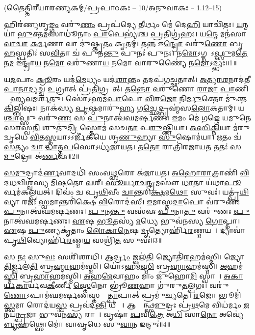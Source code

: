 
\vspace{-1ex}
\centerline{\normalsize (𑌤𑍈𑌤𑍍𑌤𑌿𑌰𑍀𑌯𑌾𑌰𑌣𑍍𑌯𑌕𑌮𑍍/𑌪𑍍𑌰𑌪𑌾𑌠𑌕𑌃 – 10/𑌅𑌨𑍁𑌵𑌾𑌕𑌃 – 1.12–15)}

𑌹𑌿𑌰॑𑌣𑍍𑌯𑌶𑍃\ul{𑌙𑍍𑌗𑌂} 𑌵𑌰𑍁॑\ul{𑌣𑌂} 𑌪𑍍𑌰𑌪॑𑌦𑍍𑌯𑍇 \ul{𑌤𑍀}𑌰𑍍𑌥𑌂 𑌮𑍇॑ 𑌦𑍇\ul{𑌹𑌿} 𑌯𑌾𑌚𑌿॑𑌤𑌃। \ul{𑌯}𑌨𑍍𑌮𑌯𑌾॑ \ul{𑌭𑍁}𑌕𑍍𑌤\ul{𑌮}𑌸𑌾𑌧𑍂॑𑌨𑌾𑌂 \ul{𑌪𑌾}𑌪𑍇𑌭𑍍𑌯॑𑌶𑍍𑌚 \ul{𑌪𑍍𑌰}𑌤𑌿𑌗𑍍𑌰॑𑌹𑌃। 𑌯\ul{𑌨𑍍𑌮𑍇} 𑌮𑌨॑𑌸𑌾 \ul{𑌵𑌾}\ul{𑌚𑌾} \ul{𑌕}\ul{𑌰𑍍𑌮}𑌣𑌾 𑌵𑌾 𑌦𑍁॑𑌷𑍍𑌕𑍃\ul{𑌤𑌂} 𑌕𑍃𑌤𑌮𑍍। 𑌤\ul{𑌨𑍍𑌨} 𑌇\ul{𑌨𑍍𑌦𑍍𑌰𑍋} 𑌵𑌰𑍁॑\ul{𑌣𑍋} 𑌬𑍃\ul{𑌹}𑌸𑍍𑌪𑌤𑌿𑌃॑ 𑌸\ul{𑌵𑌿}𑌤𑌾 𑌚॑ 𑌪𑍁𑌨\ul{𑌨𑍍𑌤𑍁} 𑌪𑍁𑌨𑌃॑ 𑌪𑍁𑌨𑌃। 𑌨\ul{𑌮𑍋}𑌽𑌗𑍍𑌨𑌯𑍇᳚𑌽\ul{𑌫𑍍𑌸𑍁}𑌮\ul{𑌤𑍇} 𑌨\ul{𑌮} 𑌇𑌨𑍍𑌦𑍍𑌰𑌾॑\ul{𑌯} 𑌨\ul{𑌮𑍋} 𑌵𑌰𑍁॑𑌣𑌾\ul{𑌯} 𑌨𑌮𑍋 𑌵𑌾𑌰𑍁𑌣𑍍𑌯𑍈॑ 𑌨\ul{𑌮𑍋}𑌽𑌦𑍍𑌭𑍍𑌯𑌃॥1॥

 𑌯\ul{𑌦}𑌪𑌾𑌂 \ul{𑌕𑍍𑌰𑍂}𑌰𑌂 𑌯𑌦॑\ul{𑌮𑍇}𑌧𑍍𑌯𑌂 𑌯𑌦॑\ul{𑌶𑌾}𑌨𑍍𑌤𑌂 𑌤𑌦𑌪॑𑌗𑌚𑍍𑌛𑌤𑌾𑌤𑍍। \ul{𑌅}\ul{𑌤𑍍𑌯𑌾}\ul{𑌶}𑌨𑌾𑌦॑𑌤𑍀\-\ul{𑌪𑌾}\ul{𑌨𑌾}\ul{𑌦𑍍𑌯}𑌚𑍍𑌚 \ul{𑌉}𑌗𑍍𑌰𑌾𑌤𑍍 𑌪𑍍𑌰॑\ul{𑌤𑌿}𑌗𑍍𑌰𑌹𑌾᳚𑌤𑍍। 𑌤\ul{𑌨𑍍𑌨𑍋} 𑌵𑌰𑍁॑𑌣𑍋 \ul{𑌰𑌾}\ul{𑌜𑌾} \ul{𑌪𑌾}𑌣𑌿𑌨𑌾᳚ 𑌹𑍍𑌯\ul{𑌵}𑌮𑌰𑍍\mbox{}𑌶॑𑌤𑍁। 𑌸𑍋॑𑌽𑌹𑌮॑\ul{𑌪𑌾}𑌪𑍋 \ul{𑌵𑌿}𑌰\ul{𑌜𑍋} 𑌨𑌿\ul{𑌰𑍍𑌮𑍁}𑌕𑍍𑌤𑍋 𑌮𑍁॑𑌕𑍍𑌤\ul{𑌕𑌿}𑌲𑍍𑌬𑌿𑌷𑌃। 𑌨𑌾𑌕॑𑌸𑍍𑌯 \ul{𑌪𑍃}𑌷𑍍𑌠𑌮𑌾𑌰𑍁॑\ul{𑌹𑍍𑌯} 𑌗\ul{𑌚𑍍𑌛𑍇}𑌦𑍍𑌬𑍍𑌰𑌹𑍍𑌮॑𑌸\ul{𑌲𑍋}𑌕𑌤𑌾𑌮𑍍। 𑌯\ul{𑌶𑍍𑌚𑌾}𑌫𑍍𑌸𑍁 𑌵𑌰𑍁॑\ul{𑌣𑌃} 𑌸 \ul{𑌪𑍁}𑌨𑌾𑌤𑍍𑌵॑𑌘𑌮𑌰𑍍\mbox{}\ul{𑌷}𑌣𑌃। \ul{𑌇}𑌮𑌂 𑌮𑍇॑ 𑌗𑌙𑍍𑌗𑍇 𑌯𑌮𑍁𑌨𑍇 𑌸𑌰𑌸𑍍𑌵\ul{𑌤𑌿} 𑌶𑍁𑌤𑍁॑\ul{𑌦𑍍𑌰𑌿} 𑌸𑍍𑌤𑍋𑌮॑ 𑌸𑌚\ul{𑌤𑌾} 𑌪\ul{𑌰𑍁}𑌷𑍍𑌣𑌿𑌯𑌾। \ul{𑌅}\ul{𑌸𑌿}\ul{𑌕𑍍𑌨𑌿}𑌯𑌾 𑌮॑𑌰𑍁𑌦𑍍\mbox{}𑌵𑍃𑌧𑍇 \ul{𑌵𑌿}𑌤\ul{𑌸𑍍𑌤}𑌯𑌾𑌽𑌽𑌰𑍍𑌜𑍀॑𑌕𑍀𑌯𑍇 𑌶𑍃\ul{𑌣𑍁}𑌹𑍍𑌯𑌾 \ul{𑌸𑍁}𑌷𑍋𑌮॑𑌯𑌾। \ul{𑌋}𑌤𑌂 𑌚॑ \ul{𑌸}𑌤𑍍𑌯𑌂 \ul{𑌚𑌾}𑌭𑍀᳚\ul{𑌦𑍍𑌧𑌾}𑌤𑍍𑌤\ul{𑌪}𑌸𑍋𑌽𑌧𑍍𑌯॑𑌜𑌾𑌯𑌤। 𑌤\ul{𑌤𑍋} 𑌰𑌾𑌤𑍍𑌰𑌿॑𑌰𑌜𑌾𑌯\ul{𑌤} 𑌤𑌤𑌃॑ 𑌸\ul{𑌮𑍁}𑌦𑍍𑌰𑍋 𑌅॑\ul{𑌰𑍍𑌣}𑌵𑌃॥2॥
 
 \ul{𑌸}\ul{𑌮𑍁}𑌦𑍍𑌰𑌾𑌦॑\ul{𑌰𑍍𑌣}𑌵𑌾𑌦𑌧𑌿॑ 𑌸𑌂𑌵\ul{𑌥𑍍𑌸}𑌰𑍋 𑌅॑𑌜𑌾𑌯𑌤। \ul{𑌅}\ul{𑌹𑍋}\ul{𑌰𑌾}𑌤𑍍𑌰𑌾𑌣𑌿॑ \ul{𑌵𑌿}𑌦\ul{𑌧}𑌦𑍍𑌵𑌿𑌶𑍍𑌵॑𑌸𑍍𑌯 𑌮𑌿\ul{𑌷}𑌤𑍋 \ul{𑌵}𑌶𑍀। \ul{𑌸𑍂}\ul{𑌰𑍍𑌯𑌾}\ul{𑌚}\ul{𑌨𑍍𑌦𑍍𑌰}𑌮𑌸𑍗॑ \ul{𑌧𑌾}𑌤𑌾 𑌯॑𑌥𑌾\ul{𑌪𑍂}𑌰𑍍𑌵𑌮॑𑌕𑌲𑍍𑌪𑌯𑌤𑍍। 𑌦𑌿𑌵𑌂॑ 𑌚 𑌪𑍃\ul{𑌥𑌿}𑌵𑍀𑌂 \ul{𑌚𑌾}𑌨𑍍𑌤𑌰𑌿॑\ul{𑌕𑍍𑌷}𑌮\ul{𑌥𑍋} 𑌸𑍁𑌵𑌃॑। 𑌯𑌤𑍍𑌪𑍃॑\ul{𑌥𑌿}𑌵𑍍𑌯𑌾 𑌰𑌜𑌃॑ \ul{𑌸𑍍𑌵}𑌮𑌾𑌨𑍍𑌤𑌰𑌿॑𑌕𑍍𑌷𑍇 \ul{𑌵𑌿}𑌰𑍋𑌦॑𑌸𑍀। \ul{𑌇}𑌮𑌾𑌸𑍍𑌤\ul{𑌦𑌾}𑌪𑍋 𑌵॑𑌰𑍁𑌣𑌃 \ul{𑌪𑍁}𑌨𑌾𑌤𑍍𑌵॑𑌘𑌮𑌰𑍍\mbox{}\ul{𑌷}𑌣𑌃। \ul{𑌪𑍁}𑌨\ul{𑌨𑍍𑌤𑍁} 𑌵𑌸॑𑌵𑌃 \ul{𑌪𑍁}𑌨𑌾\ul{𑌤𑍁} 𑌵𑌰𑍁॑𑌣𑌃 \ul{𑌪𑍁}𑌨𑌾𑌤𑍍𑌵॑𑌘𑌮𑌰𑍍\mbox{}\ul{𑌷}𑌣𑌃। \ul{𑌏}𑌷 \ul{𑌭𑍂}𑌤𑌸𑍍𑌯॑ \ul{𑌮}𑌧𑍍𑌯𑍇 𑌭𑍁𑌵॑𑌨𑌸𑍍𑌯 \ul{𑌗𑍋}𑌪𑍍𑌤𑌾। \ul{𑌏}𑌷 \ul{𑌪𑍁}𑌣𑍍𑌯𑌕𑍃॑𑌤𑌾𑌂 \ul{𑌲𑍋}\ul{𑌕𑌾}\ul{𑌨𑍇}𑌷 \ul{𑌮𑍃}𑌤𑍍𑌯𑍋𑌰𑍍\mbox{}𑌹𑌿॑\ul{𑌰}𑌣𑍍𑌮𑌯𑌮𑍍᳚। 𑌦𑍍𑌯𑌾𑌵𑌾॑𑌪𑍃\ul{𑌥𑌿}𑌵𑍍𑌯𑍋𑌰𑍍\mbox{}𑌹𑌿॑\ul{𑌰}𑌣𑍍𑌮\ul{𑌯}\ul{} 𑌸𑌶𑍍𑌰𑌿॑\ul{𑌤}\ul{} 𑌸𑍁𑌵𑌃॑॥3॥

𑌸 \ul{𑌨𑌃} 𑌸𑍁\ul{𑌵𑌃} 𑌸𑌶𑌿॑𑌶𑌾𑌧𑌿। 𑌆\ul{𑌰𑍍𑌦𑍍𑌰𑌂} 𑌜𑍍𑌵𑌲॑\ul{𑌤𑌿} 𑌜𑍍𑌯𑍋𑌤𑌿॑\ul{𑌰}𑌹𑌮॑𑌸𑍍𑌮𑌿। 𑌜𑍍𑌯𑍋\ul{𑌤𑌿}𑌰𑍍𑌜𑍍𑌵𑌲॑\ul{𑌤𑌿} 𑌬𑍍𑌰\ul{𑌹𑍍𑌮𑌾}𑌹𑌮॑𑌸𑍍𑌮𑌿। 𑌯𑍋॑𑌽𑌹𑌮॑\ul{𑌸𑍍𑌮𑌿} 𑌬𑍍𑌰\ul{𑌹𑍍𑌮𑌾}𑌹𑌮॑𑌸𑍍𑌮𑌿। \ul{𑌅}𑌹𑌮॑\ul{𑌸𑍍𑌮𑌿} 𑌬𑍍𑌰\ul{𑌹𑌾}𑌹𑌮॑𑌸𑍍𑌮𑌿। \ul{𑌅}𑌹\ul{𑌮𑍇}𑌵𑌾𑌹𑌂 𑌮𑌾𑌂 𑌜𑍁॑𑌹𑍋\ul{𑌮𑌿} 𑌸𑍍𑌵𑌾𑌹𑌾᳚।
 \ul{𑌅}\ul{𑌕𑌾}\ul{𑌰𑍍𑌯}\ul{𑌕𑌾}𑌰𑍍𑌯॑𑌵\ul{𑌕𑍀}𑌰𑍍𑌣𑍀 \ul{𑌸𑍍𑌤𑍇}𑌨𑍋 𑌭𑍍𑌰𑍂॑\ul{𑌣}𑌹𑌾 𑌗𑍁॑𑌰𑍁\ul{𑌤}𑌲𑍍𑌪𑌗𑌃। 𑌵𑌰𑍁॑\ul{𑌣𑍋}𑌽𑌪𑌾𑌮॑𑌘\-𑌮𑌰𑍍\mbox{}\ul{𑌷}𑌣𑌸𑍍𑌤𑌸𑍍𑌮𑌾᳚\ul{𑌤𑍍𑌪𑌾}𑌪𑌾𑌤𑍍 𑌪𑍍𑌰𑌮𑍁॑𑌚𑍍𑌯𑌤𑍇। \ul{𑌰}𑌜𑍋 𑌭𑍂𑌮𑌿॑\ul{𑌸𑍍𑌤𑍍𑌵}𑌮𑌾 𑌰𑍋𑌦॑𑌯\ul{𑌸𑍍𑌵} 𑌪𑍍𑌰𑌵॑𑌦\ul{𑌨𑍍𑌤𑌿} 𑌧𑍀𑌰𑌾𑌃᳚। 𑌆𑌕𑍍𑌰𑌾᳚𑌨𑍍𑌥𑍍𑌸\ul{𑌮𑍁}𑌦𑍍𑌰𑌃 𑌪𑍍𑌰॑\ul{𑌥}𑌮𑍇 𑌵𑌿𑌧॑𑌰𑍍𑌮𑌂 \ul{𑌜}𑌨𑌯॑\ul{𑌨𑍍𑌪𑍍𑌰}𑌜𑌾 𑌭𑍁𑌵॑𑌨\ul{𑌸𑍍𑌯} 𑌰𑌾𑌜𑌾᳚। 𑌵𑍃𑌷𑌾॑ \ul{𑌪}𑌵𑌿\ul{𑌤𑍍𑌰𑍇} 𑌅\ul{𑌧𑌿} 𑌸𑌾\ul{𑌨𑍋} 𑌅𑌵𑍍𑌯𑍇॑ \ul{𑌬𑍃}𑌹𑌥𑍍𑌸𑍋𑌮𑍋॑ 𑌵𑌾𑌵𑍃𑌧𑍇 𑌸𑍁\ul{𑌵𑌾}𑌨 𑌇𑌨𑍍𑌦𑍁𑌃॑॥4॥

